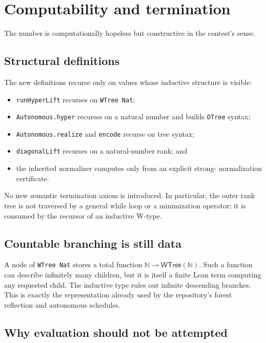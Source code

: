 \documentclass[11pt]{article}
\theoremstyle{definition}
\theoremstyle{remark}
\newcommand{\N}{\mathbb{N}}
\newcommand{\code}[1]{\texttt{#1}}
\newcommand{\WTree}{\mathsf{WTree}}
\begin{document}
\section{Computability and termination}

The number is computationally hopeless but constructive in the contest's
sense.

\subsection{Structural definitions}

The new definitions recurse only on values whose inductive structure is
visible:
\begin{itemize}[leftmargin=*]
\item \code{runHyperLift} recurses on \code{WTree Nat};
\item \code{Autonomous.hyper} recurses on a natural number and builds
  \code{OTree} syntax;
\item \code{Autonomous.realize} and \code{encode} recurse on tree syntax;
\item \code{diagonalLift} recurses on a natural-number rank; and
\item the inherited normalizer computes only from an explicit strong-
  normalization certificate.
\end{itemize}

No new semantic termination axiom is introduced.  In particular, the outer
rank tree is not traversed by a general while loop or a minimization operator;
it is consumed by the recursor of an inductive W-type.

\subsection{Countable branching is still data}

A node of \code{WTree Nat} stores a total function \(\N\to\WTree(\N)\).  Such a
function can describe infinitely many children, but it is itself a finite Lean
term computing any requested child.  The inductive type rules out infinite
descending branches.  This is exactly the representation already used by the
repository's forest reflection and autonomous schedules.

\subsection{Why evaluation should not be attempted}
\end{document}

